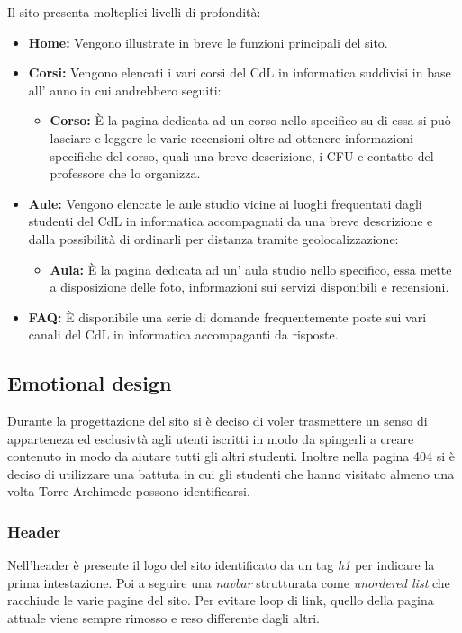 Il sito presenta molteplici livelli di profondità:
\begin{itemize}
    \item \textbf{Home: } Vengono illustrate in breve le funzioni principali del sito.
    \item \textbf{Corsi: } Vengono elencati i vari corsi del CdL in informatica suddivisi in base all' anno in cui andrebbero seguiti:
        \begin{itemize}
            \item \textbf{Corso: } \`E la pagina dedicata ad un corso nello specifico su di essa si può lasciare e leggere le varie recensioni oltre ad ottenere informazioni specifiche del corso, quali una breve descrizione, i CFU e contatto del professore che lo organizza.
        \end{itemize}
    \item \textbf{Aule: } Vengono elencate le aule studio vicine ai luoghi frequentati dagli studenti del CdL in informatica accompagnati da una breve descrizione e dalla possibilità di ordinarli per distanza tramite geolocalizzazione:
        \begin{itemize}
            \item \textbf{Aula: } È la pagina dedicata ad un' aula studio nello specifico, essa mette a disposizione delle foto, informazioni sui servizi disponibili e recensioni.
        \end{itemize}
    \item \textbf{FAQ: } \`E disponibile una serie di domande frequentemente poste sui vari canali del CdL in informatica accompaganti da risposte.
\end{itemize}

\subsection{Emotional design}
Durante la progettazione del sito si è deciso di voler trasmettere un senso di apparteneza ed esclusivtà agli utenti iscritti in modo da spingerli a creare contenuto in modo da aiutare tutti gli altri studenti.
Inoltre nella pagina 404 si è deciso di utilizzare una battuta in cui gli studenti che hanno visitato almeno una volta Torre Archimede possono identificarsi.

\subsubsection{Header}
Nell'header è presente il logo del sito identificato da un tag \textit{h1} per indicare la prima intestazione. Poi a seguire una \textit{navbar} strutturata come \textit{unordered list} che racchiude le varie pagine del sito. Per evitare loop di link, quello della pagina attuale viene sempre rimosso e reso differente dagli altri.

